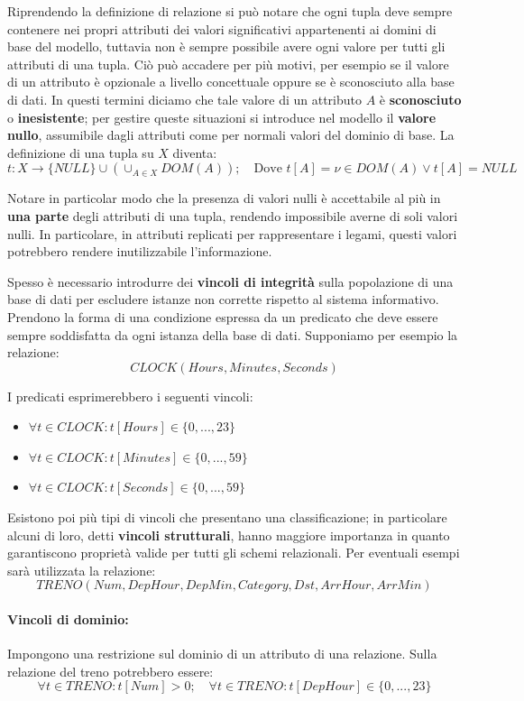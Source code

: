 \noindent Riprendendo la definizione di relazione si può notare che ogni tupla deve sempre contenere nei propri attributi dei valori significativi
appartenenti ai domini di base del modello, tuttavia non è sempre possibile avere ogni valore per tutti gli attributi di una tupla. Ciò può accadere per
più motivi, per esempio se il valore di un attributo è opzionale a livello concettuale oppure se è sconosciuto alla base di dati. In questi termini
diciamo che tale valore di un attributo $A$ è \textbf{sconosciuto} o \textbf{inesistente}; per gestire queste situazioni si introduce nel modello il
\textbf{valore nullo}, assumibile dagli attributi come per normali valori del dominio di base. La definizione di una tupla su $X$ diventa: \[
    t:X\to \{NULL\} \cup (\cup_{A\in X} DOM(A));\quad\text{Dove } t[A] = \nu\in DOM(A) \lor t[A] = NULL
\]

\noindent Notare in particolar modo che la presenza di valori nulli è accettabile al più in \textbf{una parte} degli attributi di una tupla, rendendo
impossibile averne di soli valori nulli. In particolare, in attributi replicati per rappresentare i legami, questi valori potrebbero rendere
inutilizzabile l'informazione.\par
Spesso è necessario introdurre dei \textbf{vincoli di integrità} sulla popolazione di una base di dati per escludere istanze non corrette rispetto al
sistema informativo. Prendono la forma di una condizione espressa da un predicato che deve essere sempre soddisfatta da ogni istanza della base di dati.
Supponiamo per esempio la relazione: \[
    CLOCK(Hours, Minutes, Seconds)
\]

\noindent I predicati esprimerebbero i seguenti vincoli: \begin{itemize}
    \item $\forall t\in CLOCK : t[Hours] \in \{0, ..., 23\}$
    \item $\forall t\in CLOCK : t[Minutes] \in \{0, ..., 59\}$
    \item $\forall t\in CLOCK : t[Seconds] \in \{0, ..., 59\}$
\end{itemize}

\noindent Esistono poi più tipi di vincoli che presentano una classificazione; in particolare alcuni di loro, detti \textbf{vincoli strutturali}, hanno
maggiore importanza in quanto garantiscono proprietà valide per tutti gli schemi relazionali. Per eventuali esempi sarà utilizzata la relazione: \[
    TRENO(Num, DepHour, DepMin, Category, Dst, ArrHour, ArrMin)
\]

\paragraph{Vincoli di dominio:} Impongono una restrizione sul dominio di un attributo di una relazione. Sulla relazione del treno potrebbero essere: \[
    \forall t\in TRENO : t[Num] > 0;\quad \forall t\in TRENO : t[DepHour]\in \{0, ..., 23\}
\]

